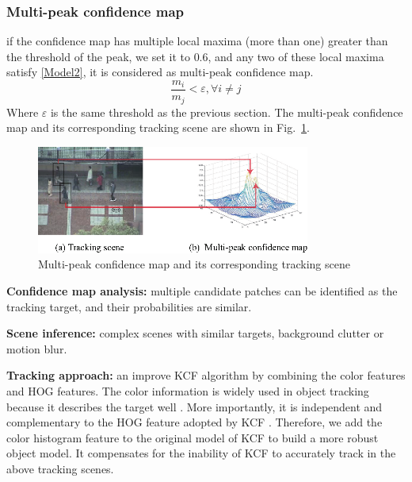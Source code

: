 \documentclass[conference]{IEEEtran}
\begin{document}
\subsubsection{Multi-peak confidence map}
if the confidence map has multiple local maxima (more than one) greater than the threshold of the peak, we set it to $0.6$, and any two of these local maxima satisfy \eqref{Model2}, it is considered as multi-peak confidence map.
\begin{equation}
   \frac{m_i}{m_j}< \varepsilon, \forall i\neq j
   \label{Model2}
\end{equation}
Where $\varepsilon$ is the same threshold as the previous section. The multi-peak confidence map and its corresponding tracking scene are shown in Fig.~\ref{fig:2}.
\begin{figure}[htbp]
	\centering
	\includegraphics[width=9cm]{con2.eps}
	\caption{Multi-peak confidence map and its corresponding tracking scene}
	\label{fig:2}
\end{figure}

\noindent
{\bfseries Confidence map analysis:} multiple candidate patches can be identified as the tracking target, and their probabilities are similar.

\noindent
{\bfseries Scene inference:} complex scenes with similar targets, background clutter or motion blur.

\noindent
{\bfseries Tracking approach:} an improve KCF algorithm by combining the color features and HOG features.
The color information is widely used in object tracking because it describes the target well \cite{colorinformation}.
More importantly, it is independent and complementary to the HOG feature adopted by KCF \cite{color2}.
Therefore, we add the color histogram feature to the original model of KCF to build a more robust object model.
It compensates for the inability of KCF to accurately track in the above tracking scenes.
\end{document}
